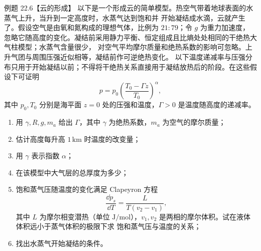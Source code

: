 \begin{origexamplebox}{例题 22.6【云的形成】}
以下是一个形成云的简单模型。热空气带着地球表面的水蒸气上升，当升到一定高度时，水蒸气达到饱和并
开始凝结成水滴，云就产生了。假设空气是由氧和氮构成的理想气体，比例为 $21:79$；令 $g$ 为重力加速度，
忽略它随高度的变化。凝结前采用静力平衡、恒定组成且比熵处处相同的干绝热大气柱模型；水蒸气含量很少，
对空气平均摩尔质量和绝热系数的影响可忽略。上升气团与周围压强近似相等，凝结前作可逆绝热变化。
以下温度递减率与压强分布只用于开始凝结以前；不得将干绝热关系直接用于凝结放热后的阶段。在这些假设下可证明
\[
  p=p_0\left(\frac{T_0-\Gamma z}{T_0}\right)^\alpha,
\]
其中 $p_0,T_0$ 分别是海平面 $z=0$ 处的压强和温度，$\Gamma>0$ 是温度随高度的递减率。
\begin{enumerate}[label=\arabic*.]
  \item 用 $\gamma,R,g,m_a$ 给出 $\Gamma$，其中 $\gamma$ 为绝热系数，$m_a$ 为空气的摩尔质量；
  \item 估计高度每升高 $1\,\mathrm{km}$ 时温度的改变量；
  \item 用 $\gamma$ 表示指数 $\alpha$；
  \item 在该模型中大气层的总厚度为多少；
  \item 饱和蒸气压随温度的变化满足 Clapeyron 方程
  \[
    \frac{\dd p_s}{\dd T}=\frac{L}{T(v_2-v_1)},
  \]
  其中 $L$ 为摩尔相变潜热（单位 $\mathrm{J/mol}$），$v_1,v_2$ 是两相的摩尔体积。试在液体体积远小于蒸气体积的极限下求
  饱和蒸气压与温度的关系；
  \item 找出水蒸气开始凝结的条件。
\end{enumerate}
\end{origexamplebox}

